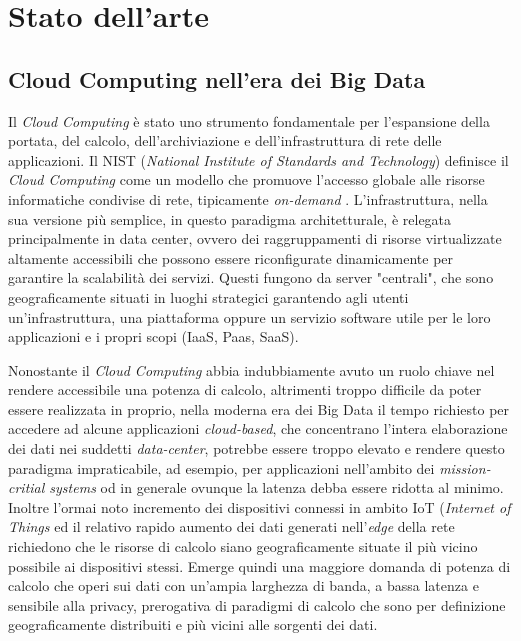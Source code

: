 \chapter{Stato dell'arte}

\section{Cloud Computing nell'era dei Big Data}

Il \textit{Cloud Computing} è stato uno strumento fondamentale per l'espansione della portata, del calcolo, dell'archiviazione e dell'infrastruttura di rete delle applicazioni. Il NIST (\textit{National Institute of Standards and Technology}) definisce il \textit{Cloud Computing} come un modello che promuove l'accesso globale alle risorse informatiche condivise di rete, tipicamente \textit{on-demand} \cite{NISTCloudComputing}. L'infrastruttura, nella sua versione più semplice, in questo paradigma architetturale, è relegata principalmente in data center, ovvero dei raggruppamenti di risorse virtualizzate altamente accessibili che possono essere riconfigurate dinamicamente per garantire la scalabilità dei servizi. Questi fungono da server "centrali", che sono geograficamente situati in luoghi strategici garantendo agli utenti un'infrastruttura, una piattaforma oppure un servizio software utile per le loro applicazioni e i propri scopi (IaaS, Paas, SaaS).

Nonostante il \textit{Cloud Computing} abbia indubbiamente avuto un ruolo chiave nel rendere accessibile una potenza di calcolo, altrimenti troppo difficile da poter essere realizzata in proprio, nella moderna era dei Big Data il tempo richiesto per accedere ad alcune applicazioni \textit{cloud-based}, che concentrano l'intera elaborazione dei dati nei suddetti \textit{data-center}, potrebbe essere troppo elevato e rendere questo paradigma impraticabile, ad esempio, per applicazioni nell'ambito dei \textit{mission-critial systems} od in generale ovunque la latenza debba essere ridotta al minimo. Inoltre l'ormai noto incremento dei dispositivi connessi in ambito IoT (\textit{Internet of Things} ed il relativo rapido aumento dei dati generati nell'\textit{edge} della rete richiedono che le risorse di calcolo siano geograficamente situate il più vicino possibile ai dispositivi stessi. Emerge quindi una maggiore domanda di potenza di calcolo che operi sui dati con un'ampia larghezza di banda, a bassa latenza e sensibile alla privacy, prerogativa di paradigmi di calcolo che sono per definizione geograficamente distribuiti e più vicini alle sorgenti dei dati.

